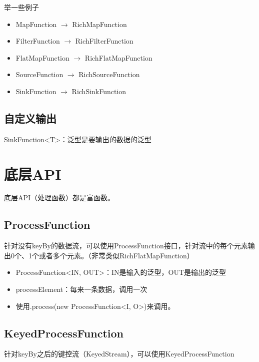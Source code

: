 \documentclass[cn,11pt,chinese]{elegantbook}
\begin{document}
举一些例子

\begin{itemize}
\item MapFunction $\rightarrow$ RichMapFunction
\item FilterFunction $\rightarrow$ RichFilterFunction
\item FlatMapFunction $\rightarrow$ RichFlatMapFunction
\item SourceFunction $\rightarrow$ RichSourceFunction
\item SinkFunction $\rightarrow$ RichSinkFunction
\end{itemize}

\section{自定义输出}

SinkFunction<T>：泛型是要输出的数据的泛型

\chapter{底层API}

底层API（处理函数）都是富函数。

\section{ProcessFunction}

针对没有keyBy的数据流，可以使用ProcessFunction接口，针对流中的每个元素输出0个、1个或者多个元素。（非常类似RichFlatMapFunction）

\begin{itemize}
  \item ProcessFunction<IN, OUT>：IN是输入的泛型，OUT是输出的泛型
  \item processElement：每来一条数据，调用一次
  \item 使用.process(new ProcessFunction<I, O>)来调用。
\end{itemize}

\section{KeyedProcessFunction}

针对keyBy之后的键控流（KeyedStream），可以使用KeyedProcessFunction
\end{document}
